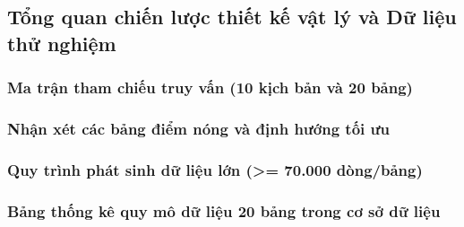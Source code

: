 \subsection{Tổng quan chiến lược thiết kế vật lý và Dữ liệu thử nghiệm}

\subsubsection{Ma trận tham chiếu truy vấn (10 kịch bản và 20 bảng)}

\subsubsection{Nhận xét các bảng điểm nóng và định hướng tối ưu}

\subsubsection{Quy trình phát sinh dữ liệu lớn (>= 70.000 dòng/bảng)}

\subsubsection{Bảng thống kê quy mô dữ liệu 20 bảng trong cơ sở dữ liệu}
